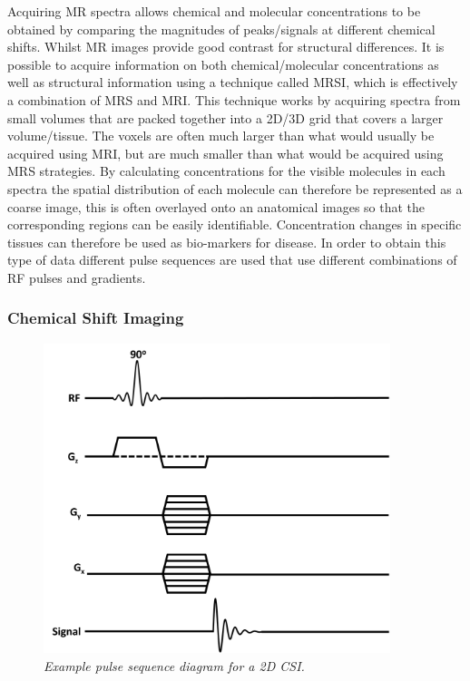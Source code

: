 Acquiring MR spectra allows chemical and molecular concentrations to be obtained by comparing the magnitudes of peaks/signals at different chemical shifts. Whilst MR images provide good contrast for structural differences. It is possible to acquire information on both chemical/molecular concentrations as well as structural information using a technique called \ac{MRSI}, which is effectively a combination of \ac{MRS} and MRI. This technique works by acquiring spectra from small volumes that are packed together into a 2D/3D grid that covers a larger volume/tissue. The voxels are often much larger than what would usually be acquired using \ac{MRI}, but are much smaller than what would be acquired using \ac{MRS} strategies. By calculating concentrations for the visible molecules in each spectra the spatial distribution of each molecule can therefore be represented as a coarse image, this is often overlayed onto an anatomical images so that the corresponding regions can be easily identifiable. Concentration changes in specific tissues can therefore be used as bio-markers for disease. In order to obtain this type of data different pulse sequences are used that use different combinations of \ac{RF} pulses and gradients. 

\subsubsection{Chemical Shift Imaging}

\begin{figure}[h]
    \centering
    \includegraphics[width=0.9\textwidth]{Figures/Theory/CSI_sequence.png}
    \caption{\textit{Example pulse sequence diagram for a 2D \ac{CSI}.}}
    \label{fig:theory:CSI}
\end{figure}


